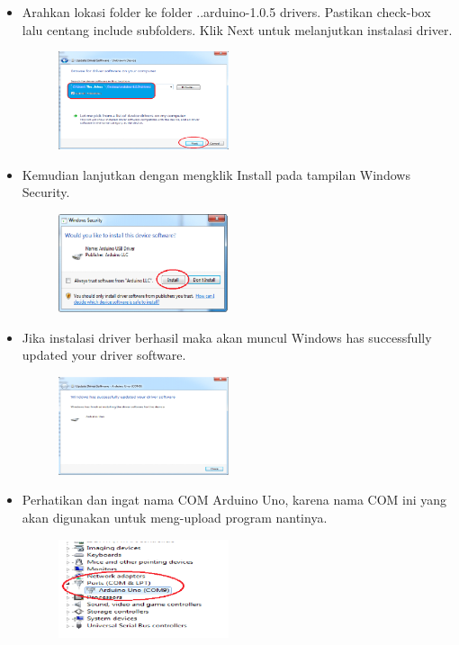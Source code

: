 \begin{enumerate}
\begin{itemize}
\item Arahkan lokasi folder ke folder ..arduino-1.0.5 drivers. Pastikan check-box lalu centang include subfolders. Klik Next untuk melanjutkan instalasi driver.
\begin{figure}[H] 
\includegraphics[width=5cm]{figures/5/Teori/1174025/no8.png}
\centering
\end{figure}

\item Kemudian lanjutkan dengan mengklik Install pada tampilan Windows Security.
\begin{figure}[H] 
\includegraphics[width=5cm]{figures/5/Teori/1174025/no9.png}
\centering
\end{figure}

\item Jika instalasi driver berhasil maka akan muncul Windows has successfully updated your driver software.
\begin{figure}[H] 
\includegraphics[width=5cm]{figures/5/Teori/1174025/no10.png}
\centering
\end{figure}

\item Perhatikan dan ingat nama COM Arduino Uno, karena nama COM ini yang akan digunakan untuk meng-upload program nantinya.
\begin{figure}[H] 
\includegraphics[width=5cm]{figures/5/Teori/1174025/no11.png}
\centering
\end{figure}
\end{itemize}
\end{enumerate}
